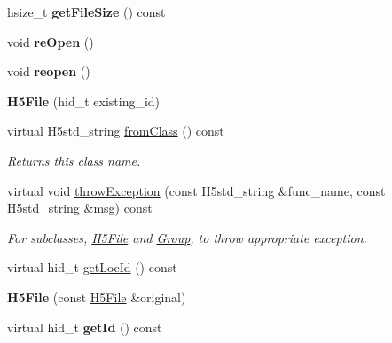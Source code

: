 \begin{DoxyCompactItemize}
hsize\+\_\+t {\bfseries get\+File\+Size} () const
\item 
\mbox{\label{class_h5_1_1_h5_file_af3f5bdd07e7b26a6090ff8361df80498}} 
void {\bfseries re\+Open} ()
\item 
\mbox{\label{class_h5_1_1_h5_file_addf8e9f932e7e4e53b27ab19a2dc1730}} 
void {\bfseries reopen} ()
\item 
\mbox{\label{class_h5_1_1_h5_file_a9c3cdbc2ab44d249e6bb34151256401c}} 
{\bfseries H5\+File} (hid\+\_\+t existing\+\_\+id)
\item 
\mbox{\label{class_h5_1_1_h5_file_ae3456c7a33bc2bcf0cdd782ad2641fff}} 
virtual H5std\+\_\+string \hyperlink{class_h5_1_1_h5_file_ae3456c7a33bc2bcf0cdd782ad2641fff}{from\+Class} () const
\begin{DoxyCompactList}\small\item\em Returns this class name. \end{DoxyCompactList}\item 
\mbox{\label{class_h5_1_1_h5_file_add05fd44e6543b5770e2a931c6ff648c}} 
virtual void \hyperlink{class_h5_1_1_h5_file_add05fd44e6543b5770e2a931c6ff648c}{throw\+Exception} (const H5std\+\_\+string \&func\+\_\+name, const H5std\+\_\+string \&msg) const
\begin{DoxyCompactList}\small\item\em For subclasses, \hyperlink{class_h5_1_1_h5_file}{H5\+File} and \hyperlink{class_h5_1_1_group}{Group}, to throw appropriate exception. \end{DoxyCompactList}\item 
virtual hid\+\_\+t \hyperlink{class_h5_1_1_h5_file_ab1c5775703262ac913dd164e77d60abc}{get\+Loc\+Id} () const
\item 
\mbox{\label{class_h5_1_1_h5_file_a912472f9bdf2bf90590a9e8ecaed3b99}} 
{\bfseries H5\+File} (const \hyperlink{class_h5_1_1_h5_file}{H5\+File} \&original)
\item 
\mbox{\label{class_h5_1_1_h5_file_a6eb07c395ad37fdca2f0150c4a5774c6}} 
virtual hid\+\_\+t {\bfseries get\+Id} () const
\item 

\end{DoxyCompactItemize}
